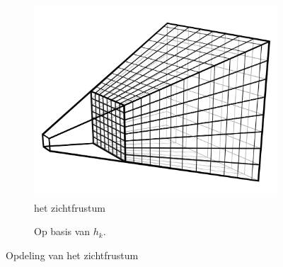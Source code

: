 \begin{figure}[t]
  \centering
  \begin{subfigure}[b]{0.35\textwidth}
    \includegraphics[width=\textwidth]{./img/raw/cs-opdeling-frustum.png}
    \caption{het zichtfrustum}
    \label{fig:cs-opdeling:frustum} %
  \end{subfigure}\quad
  \begin{subfigure}[b]{0.4\textwidth}
    \def\svgwidth{\textwidth}
    
    \caption{Op basis van $h_k$.}
    \label{fig:cs-opdeling:sleutel}
  \end{subfigure}%
  \caption{Opdeling van het zichtfrustum}
  \label{fig:cs-opdeling}
\end{figure}

